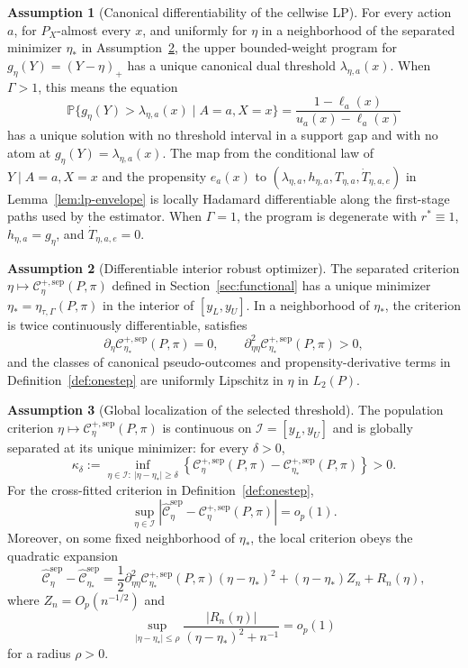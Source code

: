 \documentclass[11pt]{article}
\renewcommand{\Pr}{\mathbb{P}}
\theoremstyle{definition}
\newtheorem{assumption}{Assumption}
\theoremstyle{plain}
\theoremstyle{remark}
\begin{document}
\begin{assumption}[Canonical differentiability of the cellwise LP]\label{ass:lp-diff}
For every action \(a\), for \(P_X\)-almost every \(x\), and uniformly for
\(\eta\) in a neighborhood of the separated minimizer \(\eta_*\) in
Assumption~\ref{ass:unique-eta}, the upper bounded-weight program for
\(g_\eta(Y)=(Y-\eta)_+\) has a unique canonical dual threshold
\(\lambda_{\eta,a}(x)\).  When \(\Gamma>1\), this means the equation
\[
\Pr\{g_\eta(Y)>\lambda_{\eta,a}(x)\mid A=a,X=x\}
=
\frac{1-\ell_a(x)}{u_a(x)-\ell_a(x)}
\]
has a unique solution with no threshold interval in a support gap and with no
atom at \(g_\eta(Y)=\lambda_{\eta,a}(x)\).  The map from the conditional law of
\(Y\mid A=a,X=x\) and the propensity \(e_a(x)\) to
\((\lambda_{\eta,a},h_{\eta,a},T_{\eta,a},\dot T_{\eta,a,e})\) in
Lemma~\ref{lem:lp-envelope} is locally Hadamard differentiable along the
first-stage paths used by the estimator.  When \(\Gamma=1\), the program is
degenerate with \(r^*\equiv1\), \(h_{\eta,a}=g_\eta\), and
\(\dot T_{\eta,a,e}=0\).
\end{assumption}

\begin{assumption}[Differentiable interior robust optimizer]\label{ass:unique-eta}
The separated criterion
\(\eta\mapsto \mathcal C_\eta^{+,\mathrm{sep}}(P,\pi)\) defined in
Section~\ref{sec:functional} has a unique minimizer
\(\eta_*=\eta_{\tau,\Gamma}(P,\pi)\) in the interior of
\([y_L,y_U]\).  In a neighborhood of \(\eta_*\), the criterion is twice
continuously differentiable, satisfies
\[
\partial_\eta \mathcal C_{\eta_*}^{+,\mathrm{sep}}(P,\pi)=0,
\qquad
\partial_{\eta\eta}^2 \mathcal C_{\eta_*}^{+,\mathrm{sep}}(P,\pi)>0,
\]
and the classes of canonical pseudo-outcomes and propensity-derivative terms in
Definition~\ref{def:onestep} are uniformly Lipschitz in \(\eta\) in
\(L_2(P)\).
\end{assumption}

\begin{assumption}[Global localization of the selected threshold]\label{ass:global-eta}
The population criterion \(\eta\mapsto
\mathcal C_\eta^{+,\mathrm{sep}}(P,\pi)\) is continuous on
\(\mathcal I=[y_L,y_U]\) and is globally separated at its unique minimizer:
for every \(\delta>0\),
\[
\kappa_\delta
:=
\inf_{\eta\in\mathcal I:\ |\eta-\eta_*|\ge\delta}
\left\{
\mathcal C_\eta^{+,\mathrm{sep}}(P,\pi)
-
\mathcal C_{\eta_*}^{+,\mathrm{sep}}(P,\pi)
\right\}
>0.
\]
For the cross-fitted criterion in Definition~\ref{def:onestep},
\[
\sup_{\eta\in\mathcal I}
\left|
\widehat{\mathcal C}_\eta^{\mathrm{sep}}
-
\mathcal C_\eta^{+,\mathrm{sep}}(P,\pi)
\right|
=o_p(1).
\]
Moreover, on some fixed neighborhood of \(\eta_*\), the local criterion obeys
the quadratic expansion
\[
\widehat{\mathcal C}_\eta^{\mathrm{sep}}
-
\widehat{\mathcal C}_{\eta_*}^{\mathrm{sep}}
=
\frac12
\partial_{\eta\eta}^2
\mathcal C_{\eta_*}^{+,\mathrm{sep}}(P,\pi)(\eta-\eta_*)^2
+
(\eta-\eta_*)Z_n
+
R_n(\eta),
\]
where \(Z_n=O_p(n^{-1/2})\) and
\[
\sup_{|\eta-\eta_*|\le\rho}
\frac{|R_n(\eta)|}{(\eta-\eta_*)^2+n^{-1}}
=o_p(1)
\]
for a radius \(\rho>0\).
\end{assumption}
\end{document}
